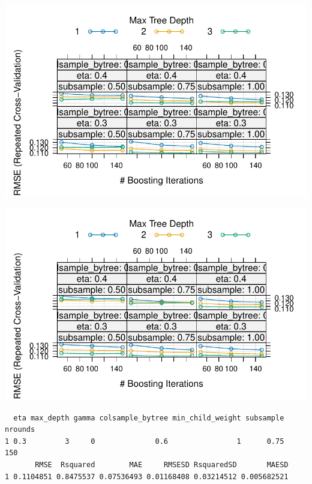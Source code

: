 \documentclass[
  letterpaper,
  DIV=11,
  numbers=noendperiod]{scrartcl}
\newenvironment{Shaded}{\begin{snugshade}}{\end{snugshade}}
\newcommand{\FunctionTok}[1]{\textcolor[rgb]{0.28,0.35,0.67}{#1}}
\newcommand{\NormalTok}[1]{\textcolor[rgb]{0.00,0.23,0.31}{#1}}
\newcommand{\SpecialCharTok}[1]{\textcolor[rgb]{0.37,0.37,0.37}{#1}}
\begin{document}
\includegraphics{MachineLearning_StaticPatterNN_Report_files/figure-pdf/hyperparameter-tuning-2.pdf}

\includegraphics{MachineLearning_StaticPatterNN_Report_files/figure-pdf/hyperparameter-tuning-3.pdf}

\begin{Shaded}
\end{Shaded}

\begin{verbatim}
  eta max_depth gamma colsample_bytree min_child_weight subsample nrounds
1 0.3         3     0              0.6                1      0.75     150
       RMSE  Rsquared        MAE     RMSESD RsquaredSD       MAESD
1 0.1104851 0.8475537 0.07536493 0.01168408 0.03214512 0.005682521
\end{verbatim}
\end{document}
